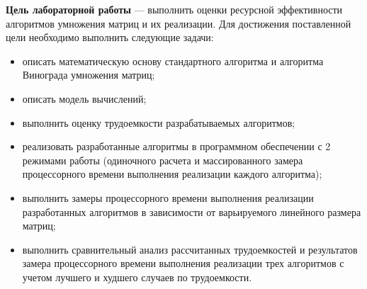 \clearpage{}

\textbf{Цель лабораторной работы} --- выполнить оценки ресурсной эффективности алгоритмов умножения матриц и их реализации. Для достижения поставленной цели необходимо выполнить следующие задачи:

\begin{itemize}
	\item[---] описать математическую основу стандартного алгоритма и алгоритма Винограда умножения матриц;
	\item[---] описать модель вычислений;
    \item[---] выполнить оценку трудоемкости разрабатываемых алгоритмов;
    \item[---] реализовать разработанные алгоритмы в программном обеспечении с 2 режимами работы (одиночного расчета и массированного замера процессорного времени выполнения реализации каждого алгоритма);
    \item[---] выполнить замеры процессорного времени выполнения реализации разработанных алгоритмов в зависимости от варьируемого линейного размера матриц;
    \item[---] выполнить сравнительный анализ рассчитанных трудоемкостей и результатов замера процессорного времени выполнения реализации трех алгоритмов с учетом лучшего и худшего случаев по трудоемкости.
\end{itemize}